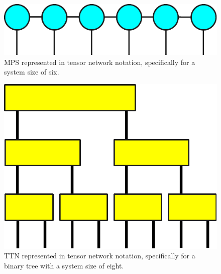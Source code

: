 \documentclass[12pt,dvipdfmx,twoside,openright]{report}
\begin{document}




\begin{figure}
    \centering
    \includegraphics[width=0.5\linewidth]{mps.pdf}
    \caption{MPS represented in tensor network notation, specifically for a system size of six.}
    \label{fig:mps}
\end{figure}
\begin{figure}
    \centering
    \includegraphics[width=0.5\linewidth]{ttn.pdf}
    \caption{TTN represented in tensor network notation, specifically for a binary tree with a system size of eight.}
    \label{fig:ttn}
\end{figure}

\end{document}

